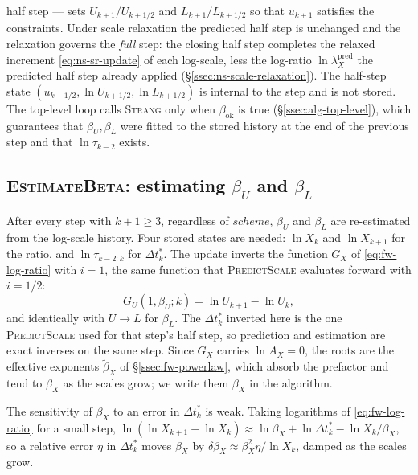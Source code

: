 \documentclass{article}
\begin{document}
half step --- sets $U_{k+1}/U_{k+1/2}$ and $L_{k+1}/L_{k+1/2}$ so that
$u_{k+1}$ satisfies the constraints. Under scale relaxation the predicted half
step is unchanged and the relaxation governs the \emph{full} step: the closing
half step completes the relaxed increment \eqref{eq:ns-sr-update} of each
log-scale, less the log-ratio $\ln \lambda_X^{\mathrm{pred}}$ the predicted
half step already applied (\S\ref{ssec:ns-scale-relaxation}).
The half-step state
$(u_{k+1/2}, \ln U_{k+1/2}, \ln L_{k+1/2})$ is internal to the step and is not
stored. The top-level loop calls \textsc{Strang} only when
$\beta_{\mathrm{ok}}$ is true (\S\ref{ssec:alg-top-level}), which guarantees
that $\beta_U, \beta_L$ were fitted to the stored history at the end of the
previous step and that $\ln \tau_{k-2}$ exists.

\subsection{\textsc{EstimateBeta}: estimating \texorpdfstring{$\beta_U$}{beta\_U} and \texorpdfstring{$\beta_L$}{beta\_L}}\label{ssec:alg-beta-estimation}
After every step with $k+1 \geq 3$, regardless of $\mathit{scheme}$, $\beta_U$
and $\beta_L$ are re-estimated from the log-scale history. Four stored states
are needed: $\ln X_k$ and $\ln X_{k+1}$ for the ratio, and $\ln \tau_{k-2:k}$
for $\Delta t_k^*$. The update inverts the
function $G_X$ of \eqref{eq:fw-log-ratio} with $i = 1$, the same function that
\textsc{PredictScale} evaluates forward with $i = 1/2$:
\begin{equation}\label{eq:alg-beta-rootfind}
  G_U(1, \beta_U; k) = \ln U_{k+1} - \ln U_k,
\end{equation}
and identically with $U \to L$ for $\beta_L$. The $\Delta t_k^*$ inverted
here is the one \textsc{PredictScale} used for that step's half step, so
prediction and estimation are exact inverses on the same step. Since $G_X$
carries $\ln A_X = 0$, the roots are the effective exponents
$\tilde\beta_X$ of \S\ref{ssec:fw-powerlaw}, which absorb the prefactor and
tend to $\beta_X$ as the scales grow; we write them $\beta_X$ in the
algorithm.

The sensitivity of $\beta_X$ to an error in $\Delta t_k^*$ is weak. Taking
logarithms of \eqref{eq:fw-log-ratio} for a small step,
$\ln(\ln X_{k+1} - \ln X_k) \approx \ln \beta_X + \ln \Delta t_k^* - \ln X_k/\beta_X$,
so a relative error $\eta$ in $\Delta t_k^*$ moves $\beta_X$ by
$\delta\beta_X \approx \beta_X^2 \eta / \ln X_k$, damped as the scales grow.
\end{document}
